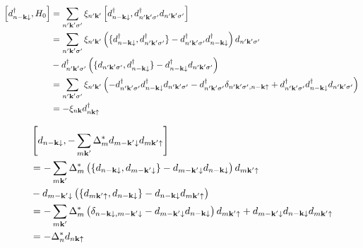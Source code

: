 \documentclass[../main.tex]{subfiles}
\begin{document}
\begin{align}
    \left[ d_{n -\bm{\mathrm{k}} \downarrow}^{\dagger}, H_0 \right]
    &= \sum_{n^{\prime} \bm{\mathrm{k}}^{\prime} \sigma^{\prime}} \xi_{n^{\prime} \bm{\mathrm{k}}^{\prime}} \left[ d_{n -\bm{\mathrm{k}} \downarrow}^{\dagger}, d_{n^{\prime} \bm{\mathrm{k}}^{\prime} \sigma^{\prime}}^{\dagger} d_{n^{\prime} \bm{\mathrm{k}}^{\prime} \sigma^{\prime}} \right] \\
    &= \sum_{n^{\prime} \bm{\mathrm{k}}^{\prime} \sigma^{\prime}} \xi_{n^{\prime} \bm{\mathrm{k}}^{\prime}}
    \left(
        \{d_{n -\bm{\mathrm{k}} \downarrow}^{\dagger}, d_{n^{\prime} \bm{\mathrm{k}}^{\prime} \sigma^{\prime}}^{\dagger} \} - d_{n^{\prime} \bm{\mathrm{k}}^{\prime} \sigma^{\prime}}^{\dagger} d_{n -\bm{\mathrm{k}} \downarrow}^{\dagger}
    \right) d_{n^{\prime} \bm{\mathrm{k}}^{\prime} \sigma^{\prime}} \\
    &- d_{n^{\prime} \bm{\mathrm{k}}^{\prime} \sigma^{\prime}}^{\dagger}
    \left(
        \{ d_{n^{\prime} \bm{\mathrm{k}}^{\prime} \sigma^{\prime}}, d_{n -\bm{\mathrm{k}} \downarrow}^{\dagger} \} - d_{n -\bm{\mathrm{k}} \downarrow}^{\dagger} d_{n^{\prime} \bm{\mathrm{k}}^{\prime} \sigma^{\prime}}
    \right) \\
    &= \sum_{n^{\prime} \bm{\mathrm{k}}^{\prime} \sigma^{\prime}} \xi_{n^{\prime} \bm{\mathrm{k}}^{\prime}}
    \left(- d_{n^{\prime} \bm{\mathrm{k}}^{\prime} \sigma^{\prime}}^{\dagger} d_{n -\bm{\mathrm{k}} \downarrow}^{\dagger} d_{n^{\prime} \bm{\mathrm{k}}^{\prime} \sigma^{\prime}}
    - d_{n^{\prime} \bm{\mathrm{k}}^{\prime} \sigma^{\prime}}^{\dagger}
    \delta_{n^{\prime} \bm{\mathrm{k}}^{\prime} \sigma^{\prime}, n -\bm{\mathrm{k}} \uparrow}
    + d_{n^{\prime} \bm{\mathrm{k}}^{\prime} \sigma^{\prime}}^{\dagger} d_{n -\bm{\mathrm{k}} \downarrow}^{\dagger} d_{n^{\prime} \bm{\mathrm{k}}^{\prime} \sigma^{\prime}} \right) \\
    &= - \xi_{n \bm{\mathrm{k}}} d_{n \bm{\mathrm{k}} \uparrow}^{\dagger}
\end{align}

\begin{align}
    &\left[d_{n -\bm{\mathrm{k}} \downarrow}, -\sum_{m \bm{\mathrm{k}}^{\prime}} \Delta_{m}^* d_{m -\bm{\mathrm{k}}^{\prime} \downarrow} d_{m \bm{\mathrm{k}}^{\prime} \uparrow} \right] \\
    &= -\sum_{m \bm{\mathrm{k}}^{\prime}} \Delta_{m}^*
    \left(\{d_{n -\bm{\mathrm{k}} \downarrow}, d_{m -\bm{\mathrm{k}}^{\prime} \downarrow}\} - d_{m -\bm{\mathrm{k}}^{\prime} \downarrow} d_{n -\bm{\mathrm{k}} \downarrow} \right) d_{m \bm{\mathrm{k}}^{\prime} \uparrow} \\
    &- d_{m -\bm{\mathrm{k}}^{\prime} \downarrow} \left(\{ d_{m \bm{\mathrm{k}}^{\prime} \uparrow}, d_{n -\bm{\mathrm{k}} \downarrow}\} - d_{n -\bm{\mathrm{k}} \downarrow} d_{m \bm{\mathrm{k}}^{\prime} \uparrow} \right) \\
    &= -\sum_{m \bm{\mathrm{k}}^{\prime}} \Delta_{m}^* \left( \delta_{n -\bm{\mathrm{k}} \downarrow, m -\bm{\mathrm{k}}^{\prime} \downarrow} - d_{m -\bm{\mathrm{k}}^{\prime} \downarrow} d_{n -\bm{\mathrm{k}} \downarrow} \right) d_{m \bm{\mathrm{k}}^{\prime} \uparrow} + d_{m -\bm{\mathrm{k}}^{\prime} \downarrow} d_{n -\bm{\mathrm{k}} \downarrow} d_{m \bm{\mathrm{k}}^{\prime} \uparrow} \\
    &= - \Delta_n^* d_{n \bm{\mathrm{k}} \uparrow}
\end{align}
\end{document}
